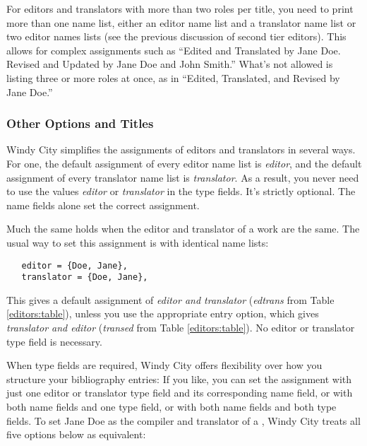 \documentclass[11pt,letterpaper,oneside]{article}
\begin{document}
For editors and translators with more than two roles per title, you
need to print more than one name list, either an editor name list and
a translator name list or two editor names lists (see the previous
discussion of second tier editors). This allows for complex
assignments such as ``Edited and Translated by Jane Doe. Revised and
Updated by Jane Doe and John Smith.'' What's not allowed is listing
three or more roles at once, as in ``Edited, Translated, and Revised
by Jane Doe.''

\subsubsection{Other Options and Titles}
\label{editors:other}

Windy City simplifies the assignments of editors and translators in
several ways. For one, the default assignment of every editor name
list is \textit{editor}, and the default assignment of every
translator name list is \textit{translator}. As a result, you never
need to use the values \textit{editor} or \textit{translator} in the
type fields. It's strictly optional. The name fields alone set the
correct assignment.

Much the same holds when the editor and translator of a work are the
same. The usual way to set this assignment is with identical name
lists:

\begin{verbatim}
   editor = {Doe, Jane},
   translator = {Doe, Jane},
\end{verbatim}

\noindent This gives a default assignment of \textit{editor and
translator} (\textit{edtrans} from Table \ref{editors:table}), unless you
use the appropriate  entry option, which gives
\textit{translator and editor} (\textit{transed} from Table
\ref{editors:table}). No editor or translator type field is necessary.

When type fields are required, Windy City offers flexibility over how
you structure your bibliography entries: If you like, you can set the
assignment with just one editor or translator type field and its
corresponding name field, or with both name fields and one type field,
or with both name fields and both type fields. To set Jane Doe as the
compiler and translator of a , Windy City treats all
five options below as equivalent:
\end{document}
